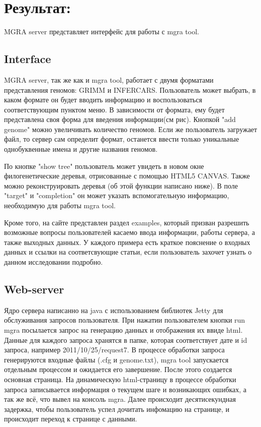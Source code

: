 \documentclass{article}
\begin{document}
\section{Результат:}
MGRA server представляет интерфейс для работы с mgra tool.
\subsection{Interface}
MGRA server, так же как и mgra tool, работает с двумя форматами представления геномов: GRIMM и INFERCARS.
Пользователь может выбрать, в каком формате он будет вводить информацию и воспользоваться соответствующим пунктом меню. В зависимости от формата, ему будет представлена своя форма для введения информации(см рис). Кнопкой "add genome" можно увеличивать количество геномов. Если же пользователь загружает файл, то сервер сам определит формат, останется ввести только уникальные однобуквенные имена и другие названия геномов.

По кнопке "show tree" пользователь может увидеть в новом окне филогенетические деревья, отрисованные с помощью HTML5 CANVAS. Также можно реконструировать деревья (об этой функции написано ниже). В поле "target" и "completion" он может указать вспомогательную информацию, необходимую для работы mgra tool.

Кроме того, на сайте представлен раздел examples, который призван разрешить возможные вопросы пользователей касаемо ввода информации, работы сервера, а также выходных данных. У каждого примера есть краткое пояснение о входных данных и ссылки на соответсвующие статьи, если пользователь захочет узнать о данном исследовании подробно.
 
\subsection{Web-server} 
Ядро сервера написанно на java с использованием библиотек Jetty для обслуживания запросов пользователя. При нажатии пользователем кнопки run mgra посылается запрос на генерацию данных и отображения их ввиде html. Данные для каждого запроса хранятся в папке, которая соответствует дате и id запроса, например 2011/10/25/request7. В процессе обработки запроса генерируются входные файлы (.cfg и genome.txt), mgra tool запускается отдельным процессом и ожидается его завершение. После этого создается основная страница. На динамическую html-страницу в процессе обработки запроса записывается информация о текущем шаге и возникающих ошибках, а так же всё, что вывел на консоль mgra. Далее происходит десятисекундная задержка, чтобы пользователь успел дочитать инфомацию на странице, и происходит переход к странице с данными.  
\end{document}
